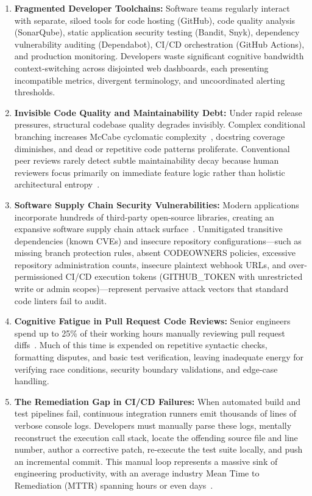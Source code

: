 \begin{enumerate}
    \item \textbf{Fragmented Developer Toolchains:} Software teams regularly interact with separate, siloed tools for code hosting (GitHub), code quality analysis (SonarQube), static application security testing (Bandit, Snyk), dependency vulnerability auditing (Dependabot), CI/CD orchestration (GitHub Actions), and production monitoring. Developers waste significant cognitive bandwidth context-switching across disjointed web dashboards, each presenting incompatible metrics, divergent terminology, and uncoordinated alerting thresholds.
    \item \textbf{Invisible Code Quality and Maintainability Debt:} Under rapid release pressures, structural codebase quality degrades invisibly. Complex conditional branching increases McCabe cyclomatic complexity~\cite{mccabe1976complexity}, docstring coverage diminishes, and dead or repetitive code patterns proliferate. Conventional peer reviews rarely detect subtle maintainability decay because human reviewers focus primarily on immediate feature logic rather than holistic architectural entropy~\cite{mcintosh2016empirical}.
    \item \textbf{Software Supply Chain Security Vulnerabilities:} Modern applications incorporate hundreds of third-party open-source libraries, creating an expansive software supply chain attack surface~\cite{srikant2022software}. Unmitigated transitive dependencies (known CVEs) and insecure repository configurations---such as missing branch protection rules, absent CODEOWNERS policies, excessive repository administration counts, insecure plaintext webhook URLs, and over-permissioned CI/CD execution tokens (GITHUB\_TOKEN with unrestricted write or admin scopes)---represent pervasive attack vectors that standard code linters fail to audit.
    \item \textbf{Cognitive Fatigue in Pull Request Code Reviews:} Senior engineers spend up to 25\% of their working hours manually reviewing pull request diffs~\cite{alhajji2021evaluating}. Much of this time is expended on repetitive syntactic checks, formatting disputes, and basic test verification, leaving inadequate energy for verifying race conditions, security boundary validations, and edge-case handling.
    \item \textbf{The Remediation Gap in CI/CD Failures:} When automated build and test pipelines fail, continuous integration runners emit thousands of lines of verbose console logs. Developers must manually parse these logs, mentally reconstruct the execution call stack, locate the offending source file and line number, author a corrective patch, re-execute the test suite locally, and push an incremental commit. This manual loop represents a massive sink of engineering productivity, with an average industry Mean Time to Remediation (MTTR) spanning hours or even days~\cite{morrison2018challenges}.
\end{enumerate}

